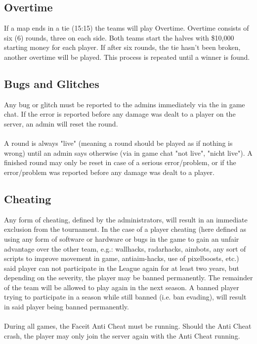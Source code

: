 \documentclass{article}
\begin{document}
\subsection{Overtime}
If a map ends in a tie (15:15) the teams will play Overtime. Overtime consists of six (6) rounds, three on each side. Both teams start the
halves with \$10,000 starting money for each player. If after six rounds, the tie hasn't been broken, another overtime will be played. This process is repeated until a winner is found. 



\subsection{Bugs and Glitches}
Any bug or glitch must be reported to the admins immediately via the in game chat. If the error is reported before any damage was dealt to a player on the server, an admin will reset the round. \\
\\
A round is always "live" (meaning a round should be played as if nothing is wrong) until an admin says otherwise (via in game chat "not 
live", "nicht live"). A finished round may only be reset in case of a serious error/problem, or if the error/problem was reported before
any damage was dealt to a player. 




\subsection{Cheating}
Any form of cheating, defined by the administrators, will result in an immediate exclusion from the tournament. In the case of a player 
cheating (here defined as using any form of software or hardware or bugs in the game to gain an unfair advantage over the other team, 
e.g.: wallhacks, radarhacks, aimbots, any sort of scripts to improve movement in game, antiaim-hacks, use of pixelboosts,  etc.) said 
player can not participate in the League again for at least two years, but depending on the severity, the player may be banned 
permanently. The remainder of the team will be allowed to play again in the next season. A banned player trying to participate in a season
while still banned (i.e. ban evading), will result in said player being banned permanently.\\
\\
During all games, the Faceit Anti Cheat must be running. Should the Anti Cheat crash, the player may only join the server again with the 
Anti Cheat running. 
\end{document}
